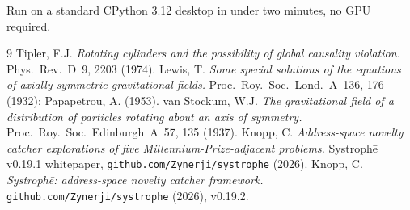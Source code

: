 \documentclass[11pt,letterpaper]{article}
\newcommand{\Systrophe}{Systroph\=e}
\begin{document}
Run on a standard CPython 3.12 desktop in under two minutes, no GPU required.

\begin{thebibliography}{9}
 Tipler, F.J. \emph{Rotating cylinders and the possibility of global causality violation.} Phys.~Rev.~D~9, 2203 (1974).
 Lewis, T. \emph{Some special solutions of the equations of axially symmetric gravitational fields.} Proc.~Roy.~Soc.~Lond.~A~136, 176 (1932); Papapetrou, A. (1953).
 van Stockum, W.J. \emph{The gravitational field of a distribution of particles rotating about an axis of symmetry.} Proc.~Roy.~Soc.~Edinburgh~A~57, 135 (1937).
 Knopp, C. \emph{Address-space novelty catcher explorations of five Millennium-Prize-adjacent problems.} \Systrophe{} v0.19.1 whitepaper, \texttt{github.com/Zynerji/systrophe} (2026).
 Knopp, C. \emph{\Systrophe: address-space novelty catcher framework.} \texttt{github.com/Zynerji/systrophe} (2026), v0.19.2.
\end{thebibliography}
\end{document}
